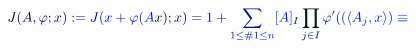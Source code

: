 \documentclass[12pt]{article}
\begin{document}
\makeatletter
\renewcommand*{\@textcolor}[3]{%
  \protect\leavevmode
  \begingroup
    \color#1{#2}#3%
  \endgroup
}
\makeatother
\begin{displaymath}
\mathcolor[RGB]{0,0,15}{J} \mathcolor[RGB]{0,0,30}{(} \mathcolor[RGB]{0,0,45}{A} \mathcolor[RGB]{0,0,60}{,} \mathcolor[RGB]{0,0,75}{\varphi} \mathcolor[RGB]{0,0,90}{;} \mathcolor[RGB]{0,0,105}{x} \mathcolor[RGB]{0,0,120}{)} \mathcolor[RGB]{0,0,135}{:} \mathcolor[RGB]{0,0,150}{=} \mathcolor[RGB]{0,0,165}{J} \mathcolor[RGB]{0,0,180}{(} \mathcolor[RGB]{0,0,195}{x} \mathcolor[RGB]{0,0,210}{+} \mathcolor[RGB]{0,0,225}{\varphi} \mathcolor[RGB]{0,0,240}{(} \mathcolor[RGB]{0,0,255}{A} \mathcolor[RGB]{0,15,0}{x} \mathcolor[RGB]{0,15,15}{)} \mathcolor[RGB]{0,15,30}{;} \mathcolor[RGB]{0,15,45}{x} \mathcolor[RGB]{0,15,60}{)} \mathcolor[RGB]{0,15,75}{=} \mathcolor[RGB]{0,15,90}{1} \mathcolor[RGB]{0,15,105}{+} \mathcolor[RGB]{0,15,120}{\sum} _ { \mathcolor[RGB]{0,15,135}{1} \mathcolor[RGB]{0,15,150}{\leq} \mathcolor[RGB]{0,15,165}{\#} \mathcolor[RGB]{0,15,180}{1} \mathcolor[RGB]{0,15,195}{\leq} \mathcolor[RGB]{0,15,210}{n} } \mathcolor[RGB]{0,15,225}{[} \mathcolor[RGB]{0,15,240}{A} \mathcolor[RGB]{0,15,255}{]} _ { \mathcolor[RGB]{0,30,0}{I} } \mathcolor[RGB]{0,30,15}{\prod} _ { \mathcolor[RGB]{0,30,30}{j} \mathcolor[RGB]{0,30,45}{\in} \mathcolor[RGB]{0,30,60}{I} } \mathcolor[RGB]{0,30,75}{\varphi} ^ { \mathcolor[RGB]{0,30,90}{\prime} } \mathcolor[RGB]{0,30,105}{(} \mathcolor[RGB]{0,30,120}{(} \mathcolor[RGB]{0,30,135}{\langle} \mathcolor[RGB]{0,30,150}{A} _ { \mathcolor[RGB]{0,30,165}{j} } \mathcolor[RGB]{0,30,180}{,} \mathcolor[RGB]{0,30,195}{x} \mathcolor[RGB]{0,30,210}{\rangle} \mathcolor[RGB]{0,30,225}{)} \mathcolor[RGB]{0,30,240}{\equiv} \mathcolor[RGB]{0,30,255}{\,
}
\end{displaymath}
\end{document}
